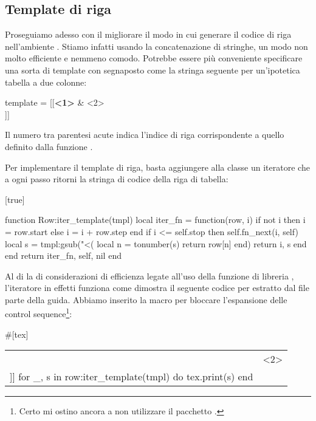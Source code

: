 \subsection{Template di riga}

Proseguiamo adesso con il migliorare il modo in cui generare il codice di riga
nell'ambiente . Stiamo infatti usando la concatenazione di
stringhe, un modo non molto efficiente e nemmeno comodo. Potrebbe essere più
conveniente specificare una sorta di template con segnaposto come la stringa
seguente per un'ipotetica tabella a due colonne:
\begin{lines}
template = [[\textbf{<1>} & <2>\\]]
\end{lines}

Il numero tra parentesi acute \code{<>} indica l'indice di riga corrispondente a
quello definito dalla funzione .

Per implementare il template di riga, basta aggiungere alla classe  un
iteratore che a ogni passo ritorni la stringa di codice della riga di tabella:

[true]
%
%
%
%
\begin{lines}
function Row:iter_template(tmpl)
    local iter_fn = function(row, i)
        if not i then
            i = row.start
        else
            i = i + row.step
        end
        if i <= self.stop then
            self.fn_next(i, self)
            local s = tmpl:gsub("<(%
                local n = tonumber(s)
                return row[n]
            end)
            return i, s
        end
    end
    return iter_fn, self, nil
end
\end{lines}

Al di la di considerazioni di efficienza legate all'uso della funzione di
libreria , l'iteratore in effetti funziona come dimostra il seguente
codice per \LuaLaTeX{} estratto dal file  parte
della guida. Abbiamo inserito la macro  per bloccare l'espansione
delle control sequence\footnote{Certo mi ostino ancora a non utilizzare il
pacchetto .}:
\begin{lines}
#[tex]
\begin{tabular}{lr}
\directlua{
local tmpl = [[\noexpand\textbf{<1>} & <2>\noexpand\\]]
for _, s in row:iter_template(tmpl) do
   tex.print(s)
end
}
\end{tabular}
\end{lines}

